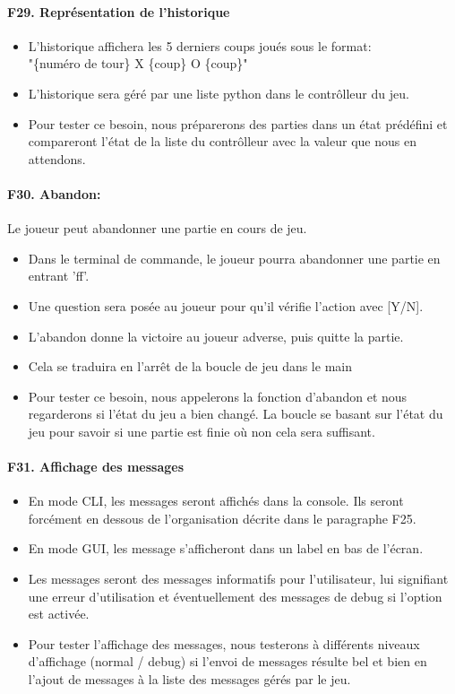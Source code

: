 \documentclass[a4paper,12pt]{article}
\begin{document}
\paragraph{F29. Représentation de l'historique}
\begin{itemize}
  \item L'historique affichera les 5 derniers coups joués sous le format:\\ "\{numéro
        de tour\} X \{coup\} O \{coup\}"
  \item L'historique sera géré par une liste python dans le contrôlleur du jeu.
  \item Pour tester ce besoin, nous préparerons des parties dans un état prédéfini et
        compareront l'état de la liste du contrôlleur avec la valeur que nous en
        attendons.
\end{itemize}

\paragraph{F30. Abandon:} Le joueur peut abandonner une partie en cours de jeu.
\begin{itemize}
  \item Dans le terminal de commande, le joueur pourra abandonner une partie en entrant
        'ff'.
  \item Une question sera posée au joueur pour qu'il vérifie l'action avec [Y/N].
  \item L'abandon donne la victoire au joueur adverse, puis quitte la partie.
  \item Cela se traduira en l'arrêt de la boucle de jeu dans le main
  \item Pour tester ce besoin, nous appelerons la fonction d'abandon et nous
        regarderons si l'état du jeu a bien changé. La boucle se basant sur l'état du
        jeu pour savoir si une partie est finie où non cela sera suffisant.
\end{itemize}

\paragraph{F31. Affichage des messages}
\begin{itemize}
  \item En mode CLI, les messages seront affichés dans la console. Ils seront forcément
        en dessous de l'organisation décrite dans le paragraphe F25.
  \item En mode GUI, les message s'afficheront dans un label en bas de l'écran.
  \item Les messages seront des messages informatifs pour l'utilisateur, lui signifiant
        une erreur d'utilisation et éventuellement des messages de debug si l'option
        est activée.
  \item Pour tester l'affichage des messages, nous testerons à différents niveaux
        d'affichage (normal / debug) si l'envoi de messages résulte bel et bien en
        l'ajout de messages à la liste des messages gérés par le jeu.
\end{itemize}
\end{document}
